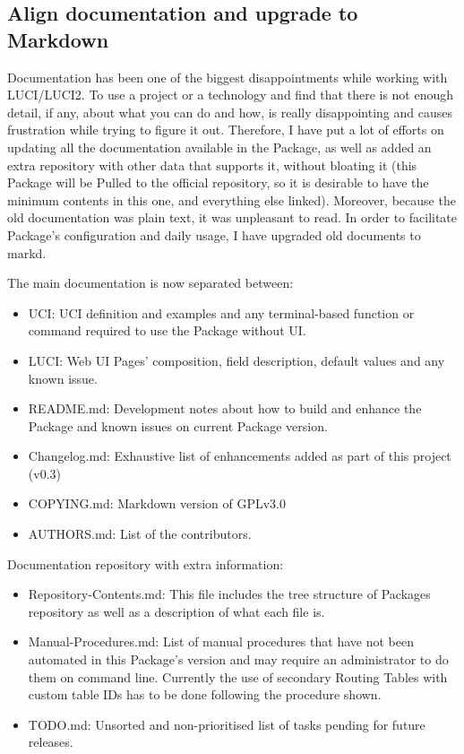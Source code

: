 \subsection{Align documentation and upgrade to Markdown}
Documentation has been one of the biggest disappointments while working with LUCI/LUCI2. To use a project or a technology and find that there is not enough detail, if any, about what you can do and how, is really disappointing and causes frustration while trying to figure it out. Therefore, I have put a lot of efforts on updating all the documentation available in the Package, as well as added an extra repository with other data that supports it, without bloating it (this Package will be Pulled to the official repository, so it is desirable to have the minimum contents in this one, and everything else linked). Moreover, because the old documentation was plain text, it was unpleasant to read. In order to facilitate Package's configuration and daily usage, I have upgraded old documents to \Gls{markd}.

The main documentation is now separated between:
\begin{itemize}
    \item UCI: UCI definition and examples and any terminal-based function or command required to use the Package without UI.
    \item LUCI: Web UI Pages' composition, field description, default values and any known issue.
    \item README.md: Development notes about how to build and enhance the Package and known issues on current Package version.
    \item Changelog.md: Exhaustive list of enhancements added as part of this project (v0.3)
    \item COPYING.md: Markdown version of GPLv3.0
    \item AUTHORS.md: List of the contributors.
\end{itemize}

Documentation repository with extra information:
\begin{itemize}
    \item Repository-Contents.md: This file includes the tree structure of Packages repository as well as a description of what each file is.
    \item Manual-Procedures.md: List of manual procedures that have not been automated in this Package's version and may require an administrator to do them on command line.
    Currently the use of secondary Routing Tables with custom table IDs has to be done following the procedure shown.
    \item TODO.md: Unsorted and non-prioritised list of tasks pending for future releases.
\end{itemize}

